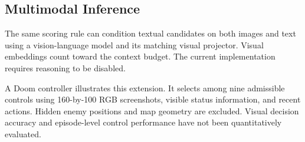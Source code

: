 \subsection{Multimodal Inference}
\label{sec:multimodal}
The same scoring rule can condition textual candidates on both images and text
using a vision-language model and its matching visual projector. Visual
embeddings count toward the context budget. The current implementation requires
reasoning to be disabled.

A Doom controller illustrates this extension. It selects among nine admissible
controls using 160-by-100 RGB screenshots, visible status information, and recent
actions. Hidden enemy positions and map geometry are excluded. Visual decision
accuracy and episode-level control performance have not been quantitatively
evaluated.

